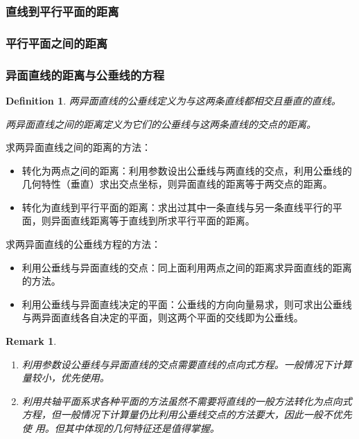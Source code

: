 \documentclass[onecolumn]{ctexart}
\newtheorem{definition}{Definition}
\newtheorem{remark}{Remark}
\begin{document}
\subsubsection{直线到平行平面的距离}

\subsubsection{平行平面之间的距离}

\subsubsection{异面直线的距离与公垂线的方程}

\begin{definition}
  两异面直线的公垂线定义为与这两条直线都相交且垂直的直线。

  两异面直线之间的距离定义为它们的公垂线与这两条直线的交点的距离。
\end{definition}

求两异面直线之间的距离的方法：
\begin{itemize}
  \item 转化为两点之间的距离：利用参数设出公垂线与两直线的交点，利用公垂线的几何特性（垂直）求出交点坐标，则异面直线的距离等于两交点的距离。
  \item 转化为直线到平行平面的距离：求出过其中一条直线与另一条直线平行的平面，则异面直线距离等于直线到所求平行平面的距离。
\end{itemize}

求两异面直线的公垂线方程的方法：
\begin{itemize}
  \item 利用公垂线与异面直线的交点：同上面利用两点之间的距离求异面直线的距离的方法。
  \item 利用公垂线与异面直线决定的平面：公垂线的方向向量易求，则可求出公垂线与两异面直线各自决定的平面，则这两个平面的交线即为公垂线。
\end{itemize}

\begin{remark}
  \begin{enumerate}
    \item 利用参数设公垂线与异面直线的交点需要直线的点向式方程。一般情况下计算量较小，优先使用。
    \item 利用共轴平面系求各种平面的方法虽然不需要将直线的一般方法转化为点向式方程，但一般情况下计算量仍比利用公垂线交点的方法要大，因此一般不优先使
    用。但其中体现的几何特征还是值得掌握。
  \end{enumerate}
\end{remark}
\end{document}
